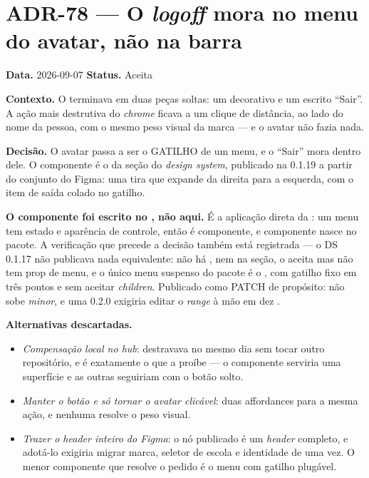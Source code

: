 \section{ADR-78 --- O \emph{logoff} mora no menu do avatar, não na barra}
\label{adr:78}

\textbf{Data.} 2026-09-07 \quad \textbf{Status.} Aceita

\textbf{Contexto.} O  terminava em duas peças soltas: um
 decorativo e um  escrito
\enquote{Sair}. A ação mais destrutiva do \emph{chrome} ficava a um clique de
distância, ao lado do nome da pessoa, com o mesmo peso visual da marca --- e o
avatar não fazia nada.

\textbf{Decisão.} O avatar passa a ser o GATILHO de um menu, e o \enquote{Sair}
mora dentro dele. O componente é o  da seção  do
\emph{design system}, publicado na 0.1.19 a partir do conjunto  do
Figma: uma tira que expande da direita para a esquerda, com o item de saída
colado no gatilho.

\textbf{O componente foi escrito no , não aqui.} É a
aplicação direta da : um menu tem estado e aparência de controle,
então é componente, e componente nasce no pacote. A verificação que precede a
decisão também está registrada --- o DS 0.1.17 não publicava nada equivalente:
não há ,  nem  na seção, o  aceita
 mas não tem prop de menu, e o único menu suspenso do pacote é o
, com gatilho fixo em três pontos e sem aceitar
\emph{children}. Publicado como PATCH de propósito:  não sobe
\emph{minor}, e uma 0.2.0 exigiria editar o \emph{range} à mão em dez
.

\textbf{Alternativas descartadas.}
\begin{itemize}
  \item \emph{Compensação local no hub}: destravava no mesmo dia sem tocar outro
    repositório, e é exatamente o que a  proíbe --- o componente
    serviria uma superfície e as outras seguiriam com o botão solto.
  \item \emph{Manter o botão e só tornar o avatar clicável}: duas affordances
    para a mesma ação, e nenhuma resolve o peso visual.
  \item \emph{Trazer o \emph{header} inteiro do Figma}: o nó publicado é um
    \emph{header} completo, e adotá-lo exigiria migrar marca, seletor de escola e
    identidade de uma vez. O menor componente que resolve o pedido é o menu com
    gatilho plugável.
\end{itemize}

